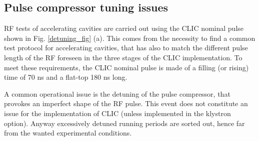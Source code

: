 \subsection[Pulse compressor tuning issues]{Pulse compressor tuning issues}

RF tests of accelerating cavities are carried out using the CLIC nominal pulse shown in Fig. \ref{detuning_fig} (a). This comes from the necessity to find a common test protocol for accelerating cavities, that has also to match the different pulse length of the RF foreseen in the three stages of the CLIC implementation. To meet these requirements, the CLIC nominal pulse is made of a filling (or rising) time of 70 ns and a flat-top 180 ns long.

A common operational issue is the detuning of the pulse compressor, that provokes an imperfect shape of the RF pulse. This event does not constitute an issue for the implementation of CLIC (unless implemented in the klystron option). Anyway excessively detuned running periods are sorted out, hence far from the wanted experimental conditions. 

